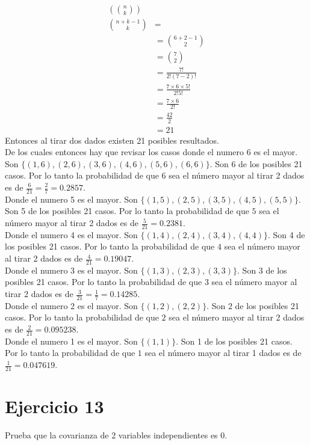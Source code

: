 \documentclass[12pt]{article}
\begin{document}
\begin{equation}
	\begin{split}
	\left(\!\!{n\choose k}\!\!\right)&\\
	{n + k - 1 \choose k}&=\\
	&= {6 + 2 - 1 \choose 2} \\
	&= {7 \choose 2} \\
	&= \frac{7!}{2!(7-2)!} \\
	&= \frac{7\times 6 \times 5!}{2!5!} \\
	&= \frac{7\times 6}{2!} \\
	&= \frac{42}{2} \\
	&= 21
	\end{split}
\end{equation}
Entonces al tirar dos dados existen 21 posibles resultados.\\
De los cuales entonces hay que revisar los casos donde el numero 6 es el mayor. Son $\{(1,6), (2,6), (3, 6), (4, 6), (5, 6), (6, 6)\}$. Son 6 de los posibles 21 casos. Por lo tanto la probabilidad de que $6$ sea el número mayor al tirar 2 dados es de $\frac{6}{21} = \frac{2}{7} = 0.2857$.\\
Donde el numero 5 es el mayor. Son $\{(1,5), (2,5), (3, 5), (4, 5), (5, 5)\}$. Son 5 de los posibles 21 casos. Por lo tanto la probabilidad de que $5$ sea el número mayor al tirar 2 dados es de $\frac{5}{21} = 0.2381$.\\
Donde el numero 4 es el mayor. Son $\{(1,4), (2,4), (3, 4), (4, 4)\}$. Son 4 de los posibles 21 casos. Por lo tanto la probabilidad de que $4$ sea el número mayor al tirar 2 dados es de $\frac{4}{21} = 0.19047$.\\
Donde el numero 3 es el mayor. Son $\{(1,3), (2,3), (3, 3)\}$. Son 3 de los posibles 21 casos. Por lo tanto la probabilidad de que $3$ sea el número mayor al tirar 2 dados es de $\frac{3}{21} = \frac{1}{7} = 0.14285$.\\
Donde el numero 2 es el mayor. Son $\{(1,2), (2,2)\}$. Son 2 de los posibles 21 casos. Por lo tanto la probabilidad de que $2$ sea el número mayor al tirar 2 dados es de $\frac{2}{21} = 0.095238$.\\
Donde el numero 1 es el mayor. Son $\{(1,1)\}$. Son 1 de los posibles 21 casos. Por lo tanto la probabilidad de que $1$ sea el número mayor al tirar 1 dados es de $\frac{1}{21} = 0.047619$.\\
\section{Ejercicio 13}
 Prueba que la covarianza de 2 variables independientes es 0.
\end{document}
